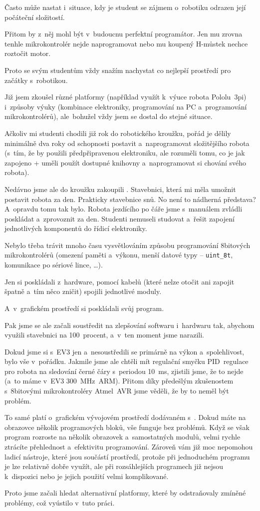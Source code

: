 Často může nastat i~situace, kdy je student se zájmem o~robotiku odrazen její počáteční složitostí.

Přitom by z~něj mohl být v~budoucnu perfektní programátor. 
Jen mu zrovna tenhle mikrokontrolér nejde naprogramovat nebo mu koupený H-můstek nechce roztočit motor.

Proto se svým studentům vždy snažím nachystat co nejlepší prostředí pro začátky s~robotikou. 

Již jsem zkoušel různé platformy (například využít k~výuce robota Pololu~3pi) i~způsoby výuky (kombinace elektroniky, programování na PC a~programování mikrokontrolérů), ale~bohužel vždy jsem se dostal do stejné situace. 

Ačkoliv mi studenti chodili již rok do robotického kroužku, pořád je dělily minimálně dva roky od schopnosti postavit a~naprogramovat složitějšího robota (s~tím, že by použili předpřipravenou elektroniku, ale rozuměli tomu, co je jak zapojeno + uměli použít dostupné knihovny a~naprogramovat si chování svého robota).

Nedávno jsme ale do kroužku zakoupili \legoEV{}. 
Stavebnici, která mi měla umožnit postavit robota za den. 
Prakticky stavebnice snů. No není to nádherná představa?
A~opravdu tomu tak bylo. Robota jezdícího po čáře jsme s~manuálem zvládli poskládat a~zprovoznit za den. 
Studenti nemuseli studovat a~řešit zapojení jednotlivých komponentů do řídicí elektroniky. 

Nebylo třeba trávit mnoho času vysvětlováním způsobu programování 8bitových mikrokontrolérů (omezení paměti a~výkonu, menší datové typy -- \verb|uint_8t|, komunikace po sériové lince, \dots).

Jen si poskládali z~\lega{ }hardware, pomocí kabelů (které nelze otočit ani zapojit špatně a~tím něco zničit) spojili jednotlivé moduly. 

A~v~grafickém prostředí si poskládali svůj program.

Pak jsme se ale začali soustředit na zlepšování softwaru i~hardwaru tak, abychom využili stavebnici na 100~procent, a~v~ten moment jsme narazili.

Dokud jsme si s~EV3 jen  a~nesoustředili se primárně na výkon a~spolehlivost, bylo vše v~pořádku. 
Jakmile jsme ale chtěli mít regulační smyčku PID~regulace pro robota na sledování černé čáry s~periodou 10~ms, zjistili jsme, že to nejde (a~to máme v~EV3  300~MHz~ARM). Přitom díky předešlým zkušenostem s~8bitovými mikrokontroléry Atmel~AVR jsme věděli, že by to neměl být problém.


To samé platí o~grafickém vývojovém prostředí dodávaném s~\EVthree. Dokud máte na obrazovce několik programových bloků, vše funguje bez problémů. 
Když se však program rozroste na několik obrazovek a~samostatných modulů, velmi rychle ztrácíte přehlednost a~efektivitu programování.
Zároveň vám již moc nepomohou ladicí nástroje, které jsou součástí prostředí, protože při jednoduchém programu je lze relativně dobře využít, ale při rozsáhlejších programech již nejsou k~dispozici nebo je jejich použití velmi komplikované. 


Proto jsme začali hledat alternativní platformy, které by odstraňovaly zmíněné problémy, což vyústilo v~tuto práci.   

